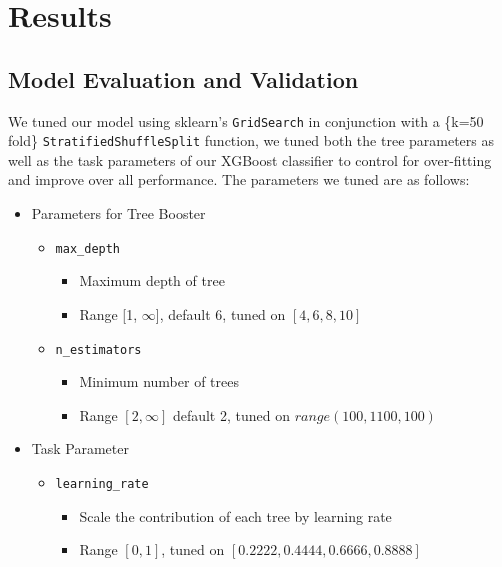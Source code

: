 



\chapter*{Results}


\section*{Model Evaluation and Validation}

We tuned our model using sklearn's \texttt{GridSearch} in conjunction with a \{k=50 fold\} \texttt{StratifiedShuffleSplit} function, we tuned both the tree parameters as well as the task parameters of our XGBoost classifier to control for over-fitting and improve over all performance. The parameters we tuned are as follows:

\begin{itemize}
\item Parameters for Tree Booster
    \begin{itemize}
        \item \texttt{max\_depth}
        \begin{itemize}
            \item Maximum depth of tree
            \item Range [1, $\infty$], default 6, tuned on $[4, 6, 8, 10]$
        \end{itemize}
        \item \texttt{n\_estimators}
        \begin{itemize}
            \item Minimum number of trees
            \item Range $[2,\infty]$ default 2, tuned on $range(100, 1100, 100)$
        \end{itemize}

    \end{itemize}

\item Task Parameter
    \begin{itemize}
        \item \texttt{learning\_rate}
        \begin{itemize}
            \item Scale the contribution of each tree by learning rate
            \item Range $[0, 1]$, tuned on $[0.2222, 0.4444, 0.6666, 0.8888]$
        \end{itemize}
    \end{itemize}
\end{itemize}


